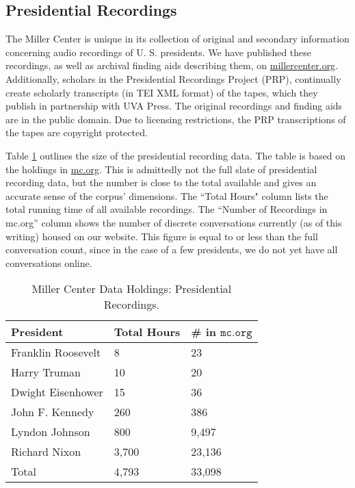 \documentclass[12pt, oneside]{article}   	%
\begin{document}
\subsection{Presidential Recordings}\label{section.data.prp}
The Miller Center is unique in its collection of original and secondary information concerning audio recordings of U. S. presidents.  We have published these recordings, as well as archival finding aids describing them, on \url{millercenter.org}.  Additionally, scholars in the Presidential Recordings Project (PRP), continually create scholarly transcripts (in TEI XML format) of the tapes, which they publish in partnership with UVA Press.   The original recordings and finding aids are in the public domain.  Due to licensing restrictions, the PRP transcriptions of the tapes are copyright protected.   

Table \ref{table.data.prp} outlines the size of the presidential recording data.  The table is based on the holdings in \href{millercenter.org}{mc.org}.  This is admittedly not the full slate of presidential recording data, but the number is close to the total available and gives an accurate sense of the corpus’ dimensions.  The ``Total Hours" column lists the total running time of all available recordings.  The ``Number of Recordings in mc.org” column shows the number of discrete conversations currently (as of this writing) housed on our website.  This figure is equal to or less than the full conversation count, since in the case of a few presidents, we do not yet have all conversations online.  

\begin{table}[htp]
\caption{Miller Center Data Holdings: Presidential Recordings.}
\begin{center}
\begin{tabular}{ p{2in} l l }
\toprule
President				&	Total Hours		&	\#  in $\mathtt{mc.org}$	\\
\midrule
 Franklin Roosevelt 		& 	8 				& 	23 \\ 
 \midrule 
 Harry Truman 			& 	10 				& 	20 \\  
 \midrule
 Dwight Eisenhower	 	& 	15 				& 	36   \\
 \midrule
 John F. Kennedy	 	& 	260 				& 	386   \\
 \hline
 Lyndon Johnson	 	& 	800 				& 	9,497   \\
 \midrule
 Richard Nixon		 	& 	3,700			& 	23,136   \\
\bottomrule
Total					&	4,793			&	33,098	\\
\bottomrule
\end{tabular}
\end{center}
\label{table.data.prp}
\end{table}%
\end{document}
